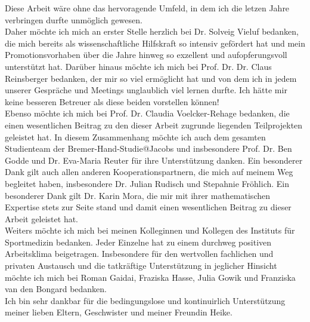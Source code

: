 Diese Arbeit wäre ohne das hervoragende Umfeld, in dem ich die letzen Jahre verbringen durfte unmöglich gewesen.\\
Daher möchte ich mich an erster Stelle herzlich bei Dr. Solveig Vieluf bedanken, die mich bereits als wissenschaftliche Hilfskraft so intensiv gefördert hat und mein Promotionsvorhaben über die Jahre hinweg so exzellent und aufopferungsvoll unterstützt hat. Darüber hinaus möchte ich mich bei Prof. Dr. Dr. Claus Reinsberger bedanken, der mir so viel ermöglicht hat und von dem ich in jedem unserer Gespräche und Meetings unglaublich viel lernen durfte. Ich hätte mir keine besseren Betreuer als diese beiden vorstellen können!\\
Ebenso möchte ich mich bei Prof. Dr. Claudia Voelcker-Rehage bedanken, die einen wesentlichen Beitrag zu den dieser Arbeit zugrunde liegenden Teilprojekten geleistet hat. In diesem Zusammenhang möchte ich auch dem gesamten Studienteam der Bremer-Hand-Studie@Jacobs und insbesondere Prof. Dr. Ben Godde und Dr. Eva-Maria Reuter für ihre Unterstützung danken. Ein besonderer Dank gilt auch allen anderen Kooperationspartnern, die mich auf meinem Weg begleitet haben, insbesondere Dr. Julian Rudisch und Stepahnie Fröhlich. Ein besonderer Dank gilt Dr. Karin Mora, die mir mit ihrer mathematischen Expertise stets zur Seite stand und damit einen wesentlichen Beitrag zu dieser Arbeit geleistet hat.\\
Weiters möchte ich mich bei meinen Kolleginnen und Kollegen des Instituts für Sportmedizin bedanken. Jeder Einzelne hat zu einem durchweg positiven Arbeitsklima beigetragen. Insbesondere für den wertvollen fachlichen und privaten Austausch und die tatkräftige Unterstützung in jeglicher Hinsicht möchte ich mich bei Roman Gaidai, Fraziska Hasse, Julia Gowik und Franziska van den Bongard bedanken.\\
Ich bin sehr dankbar für die bedingungslose und kontinuirlich Unterstützung meiner lieben Eltern, Geschwister und meiner Freundin Heike.